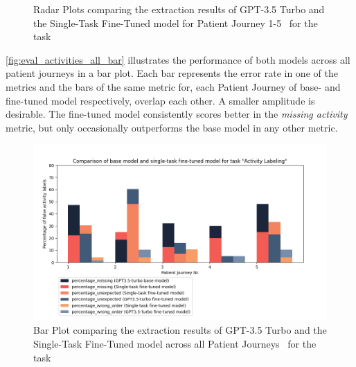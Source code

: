 \begin{figure}
  \caption{Radar Plots comparing the extraction results of GPT-3.5 Turbo and the Single-Task Fine-Tuned model for Patient Journey 1-5~ for the task }
  \label{fig:eval_activities_single_rad}
\end{figure}
\autoref{fig:eval_activities_all_bar} illustrates the performance of both models across all patient journeys in a bar plot. Each bar represents the error rate in one of the metrics and the bars of the same metric for, each Patient Journey of base- and fine-tuned model respectively, overlap each other. A smaller amplitude is desirable. The fine-tuned model consistently scores better in the \emph{missing activity} metric, but only occasionally outperforms the base model in any other metric.
\begin{figure}
    \centering
    \includegraphics[width=\textwidth]{bachelor_thesis/images/activites_all-single.png}
    \caption{Bar Plot comparing the extraction results of GPT-3.5 Turbo and the Single-Task Fine-Tuned model across all Patient Journeys~ for the task } 
    \label{fig:eval_activities_all_bar}
\end{figure}

